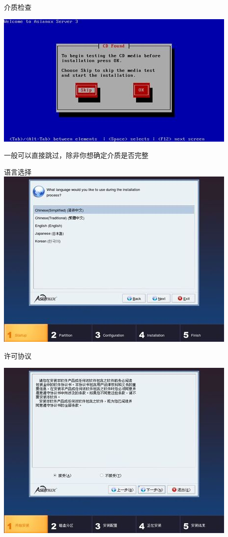 \begin{frame}{介质检查}

\includegraphics[width=.5\textwidth]{images/axs3-install/disc-check}

\alert{一般可以直接跳过，除非你想确定介质是否完整}

\end{frame}


\begin{frame}{语言选择}
\includegraphics[width=.5\textwidth]{images/axs3-install/lang-choose}
\end{frame}


\begin{frame}{许可协议}

\includegraphics[width=.5\textwidth]{images/axs3-install/eula}
\end{frame}

